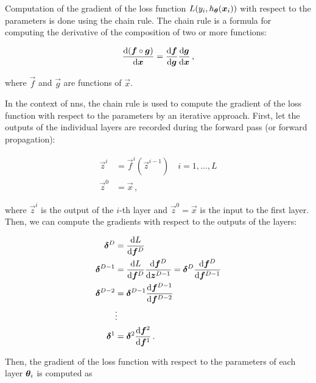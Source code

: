 Computation of the gradient of the loss function $L(y_i, h_{{\boldsymbol{\theta}}}({\boldsymbol{x}}_i))$ with respect to the parameters \nnparams
is done using the chain rule. The chain rule is a formula for computing the derivative of the composition of two or more
functions:

\begin{equation}
    \dv{(\vec{f} \circ \vec{g})}{\vec{x}} = \dv{\vec{f}}{\vec{g}} \dv{\vec{g}}{\vec{x}}\,,
\end{equation}

where $\vec{f}$ and $\vec{g}$ are functions of $\vec{x}$.

In the context of \glspl{nn}, the chain rule is used to compute the gradient of the loss function with respect to the
parameters \nnparams by an iterative approach. First, let the outputs of the individual layers are recorded during the
forward pass (or forward propagation):

\begin{align}
    \vec{z}^i & = \vec{f}^i(\vec{z}^{i-1}) \quad i = 1, \dots, L \\
    \vec{z}^0 & = \vec{x}\,,
\end{align}

where $\vec{z}^i$ is the output of the $i$-th layer and $\vec{z}^0 = \vec{x}$ is the input to the first layer. Then, we
can compute the gradients with respect to the outputs of the layers:

\begin{align}
    \vec{\delta}^D     & = \dv{L}{\vec{f}^D}                                                                              \\
    \vec{\delta}^{D-1} & = \dv{L}{\vec{f}^D} \dv{\vec{f}^D}{\vec{z}^{D-1}} = \vec{\delta}^D \dv{\vec{f}^D}{\vec{f}^{D-1}} \\
    \vec{\delta}^{D-2} & = \vec{\delta}^{D-1} \dv{\vec{f}^{D-1}}{\vec{f}^{D-2}}                                           \\
                       & \vdots \nonumber                                                                                 \\
    \vec{\delta}^1     & = \vec{\delta}^2 \dv{\vec{f}^2}{\vec{f}^1}\,.
\end{align}

Then, the
gradient of the loss function with respect to the parameters of each layer ${\boldsymbol{\theta}}_i$ is computed as

